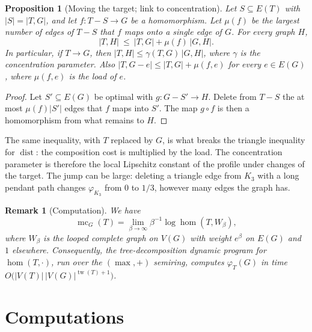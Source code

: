 \documentclass{article}
\newtheorem{proposition}[theorem]{Proposition}
\newtheorem{remark}[theorem]{Remark}
\begin{document}
\begin{proposition}[Moving the target; link to concentration]
\label{prop:profile_lip}
Let $S\subseteq E(T)$ with $|S|=|T,G|$, and let $f\colon T-S\to G$ be a
homomorphism.  Let $\mu(f)$ be the largest number of edges of $T-S$ that
$f$ maps onto a single edge of $G$.  For every graph $H$,
\[
  |T,H|\ \le\ |T,G|+\mu(f)\,|G,H|.
\]
In particular, if $T\to G$, then $|T,H|\le\gamma(T,G)\,|G,H|$, where
$\gamma$ is the concentration parameter.  Also $|T,G-e|\le|T,G|+\mu(f,e)$
for every $e\in E(G)$, where $\mu(f,e)$ is the load of $e$.
\end{proposition}

\begin{proof}
Let $S'\subseteq E(G)$ be optimal with $g\colon G-S'\to H$.  Delete from
$T-S$ the at most $\mu(f)|S'|$ edges that $f$ maps into $S'$.  The map
$g\circ f$ is then a homomorphism from what remains to $H$.
\end{proof}

The same inequality, with $T$ replaced by $G$, is what breaks the triangle
inequality for $\operatorname{dist}$: the composition cost is multiplied by
the load.  The concentration parameter is therefore the local Lipschitz
constant of the profile under changes of the target.  The jump can be large:
deleting a triangle edge from $K_3$ with a long pendant path changes
$\varphi_{K_3}$ from $0$ to $1/3$, however many edges the graph has.

\begin{remark}[Computation]
We have
\[
  \operatorname{mc}_G(T)=\lim_{\beta\to\infty}\beta^{-1}\log\hom(T,W_\beta),
\]
where $W_\beta$ is the looped complete graph on $V(G)$ with weight $e^\beta$
on $E(G)$ and $1$ elsewhere.  Consequently, the tree-decomposition dynamic
program for $\hom(T,\cdot)$, run over the $(\max,+)$ semiring, computes
$\varphi_T(G)$ in time
$O\bigl(|V(T)|\,|V(G)|^{\operatorname{tw}(T)+1}\bigr)$.
\end{remark}

\section{Computations}
\label{sec:computations}
\end{document}
